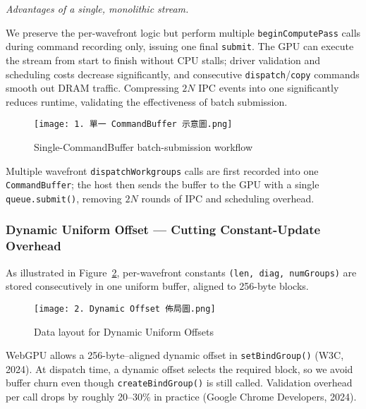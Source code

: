 \documentclass[PhD]{PHlab-thesis}
\begin{document}
\textit{Advantages of a single, monolithic stream.}

We preserve the per-wavefront logic but perform multiple \texttt{beginComputePass} calls during command recording only, issuing one final \texttt{submit}. The GPU can execute the stream from start to finish without CPU stalls; driver validation and scheduling costs decrease significantly, and consecutive \texttt{dispatch}/\texttt{copy} commands smooth out DRAM traffic. Compressing $2N$ IPC events into one significantly reduces runtime, validating the effectiveness of batch submission.
\begin{figure}[htbp]
    \centering
    \texttt{[image: 1. 單一 CommandBuffer 示意圖.png]}
    \caption{Single-CommandBuffer batch-submission workflow}
    \label{fig:scb-batch-workflow}
\end{figure}

Multiple wavefront \texttt{dispatchWorkgroups} calls are first recorded into one \texttt{CommandBuffer}; the host then sends the buffer to the GPU with a single \texttt{queue.submit()}, removing $2N$ rounds of IPC and scheduling overhead.

\subsubsection{Dynamic Uniform Offset — Cutting Constant-Update Overhead}
As illustrated in Figure~\ref{fig:dynamic-offset-layout}, per-wavefront constants \texttt{(len, diag, numGroups)} are stored consecutively in one uniform buffer, aligned to 256-byte blocks.

\begin{figure}[htbp]
    \centering
    \texttt{[image: 2. Dynamic Offset 佈局圖.png]}
    \caption{Data layout for Dynamic Uniform Offsets}
    \label{fig:dynamic-offset-layout}
\end{figure}

WebGPU allows a 256-byte–aligned dynamic offset in \texttt{setBindGroup()} (W3C, 2024). At dispatch time, a dynamic offset selects the required block, so we avoid buffer churn even though \texttt{createBindGroup()} is still called. Validation overhead per call drops by roughly 20–30\% in practice (Google Chrome Developers, 2024).
\end{document}
